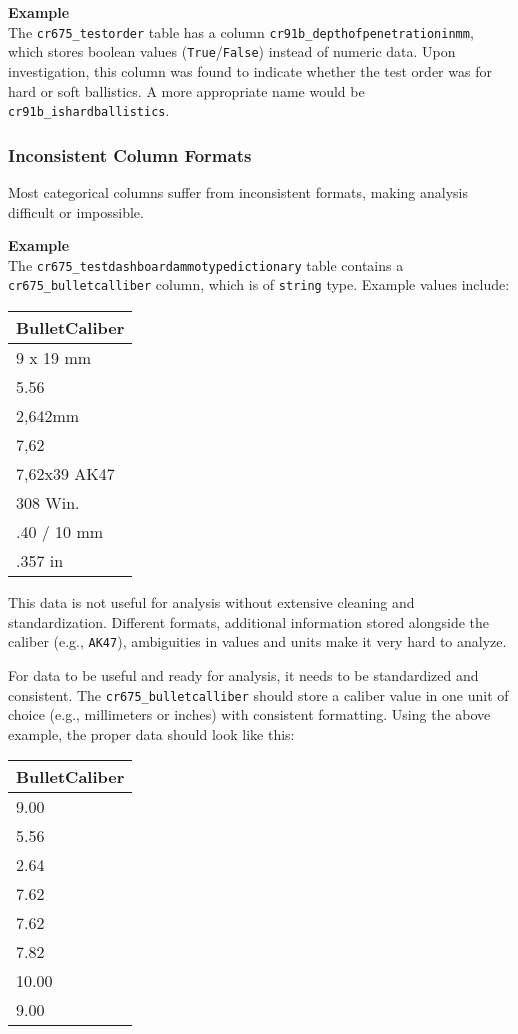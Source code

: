 \textbf{Example}\\
The \texttt{cr675\_testorder} table has a column \texttt{cr91b\_depthofpenetrationinmm}, which stores boolean values (\texttt{True}/\texttt{False}) instead of numeric data. Upon investigation, this column was found to indicate whether the test order was for hard or soft ballistics. A more appropriate name would be \texttt{cr91b\_ishardballistics}.

\newpage

\subsubsection{Inconsistent Column Formats}
Most categorical columns suffer from inconsistent formats, making analysis difficult or impossible.

\textbf{Example}\\
The \texttt{cr675\_testdashboardammotypedictionary} table contains a \texttt{cr675\_bulletcalliber} column, which is of \texttt{string} type. Example values include:

\begin{table}[h!]
	\centering
	\begin{tabular}{|l|}
	\hline
	\textbf{BulletCaliber} \\
	\hline
	9 x 19 mm \\
	5.56 \\
	2,642mm \\
	7,62 \\
	7,62x39 AK47 \\
	308 Win. \\
	.40 / 10 mm \\
	.357 in \\
	\hline
	\end{tabular}
\end{table}

This data is not useful for analysis without extensive cleaning and standardization. Different formats, additional information stored alongside the caliber (e.g., \texttt{AK47}), ambiguities in values and units make it very hard to analyze.

For data to be useful and ready for analysis, it needs to be standardized and consistent. The \texttt{cr675\_bulletcalliber} should store a caliber value in one unit of choice (e.g., millimeters or inches) with consistent formatting. Using the above example, the proper data should look like this:

\begin{table}[h!]
	\centering
	\begin{tabular}{|l|}
	\hline
	\textbf{BulletCaliber} \\
	\hline
	9.00 \\
	5.56 \\
	2.64 \\
	7.62 \\
	7.62 \\
	7.82 \\
	10.00 \\
	9.00 \\
	\hline
	\end{tabular}
\end{table}

